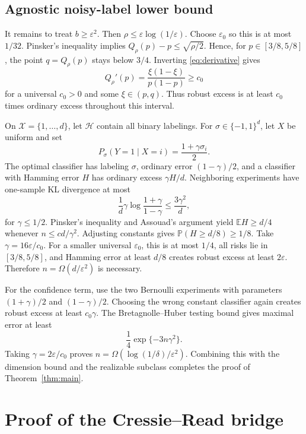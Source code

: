 \documentclass{article}
\theoremstyle{remark}
\newcommand{\E}{\mathbb E}
\newcommand{\Pp}{\mathbb P}
\newcommand{\cH}{\mathcal H}
\newcommand{\eps}{\varepsilon}
\begin{document}
\subsection{Agnostic noisy-label lower bound}

It remains to treat $b\ge\eps^2$.  Then
$\rho\le\eps\log(1/\eps)$.  Choose $\eps_0$ so this is at most $1/32$.
Pinsker's inequality implies
$Q_\rho(p)-p\le\sqrt{\rho/2}$.  Hence, for $p\in[3/8,5/8]$, the point
$q=Q_\rho(p)$ stays below $3/4$.  Inverting
\eqref{eq:derivative} gives
\[
 Q_\rho'(p)=\frac{\xi(1-\xi)}{p(1-p)}\ge c_0
 \label{eq:Q-sensitivity}
\]
for a universal $c_0>0$ and some $\xi\in(p,q)$.  Thus robust excess is at
least $c_0$ times ordinary excess throughout this interval.

On $\mathcal X=\{1,\ldots,d\}$, let $\cH$ contain all binary labelings.  For
$\sigma\in\{-1,1\}^d$, let $X$ be uniform and set
\[
 P_\sigma(Y=1\mid X=i)=\frac{1+\gamma\sigma_i}{2}.
\]
The optimal classifier has labeling $\sigma$, ordinary error
$(1-\gamma)/2$, and a classifier with Hamming error $H$ has ordinary excess
$\gamma H/d$.  Neighboring experiments have one-sample KL divergence at most
\[
 \frac1d\gamma\log\frac{1+\gamma}{1-\gamma}
 \le\frac{3\gamma^2}{d},
\]
for $\gamma\le1/2$.  Pinsker's inequality and Assouad's argument yield
$\E H\ge d/4$ whenever $n\le c d/\gamma^2$.  Adjusting constants gives
$\Pp(H\ge d/8)\ge1/8$.  Take
$\gamma=16\eps/c_0$.  For a smaller universal $\eps_0$, this is at most
$1/4$, all risks lie in $[3/8,5/8]$, and Hamming error at least $d/8$ creates
robust excess at least $2\eps$.  Therefore
$n=\Omega(d/\eps^2)$ is necessary.

For the confidence term, use the two Bernoulli experiments with parameters
$(1+\gamma)/2$ and $(1-\gamma)/2$.  Choosing the wrong constant classifier
again creates robust excess at least $c_0\gamma$.  The
Bretagnolle--Huber testing bound gives maximal error at least
\[
 \frac14\exp\{-3n\gamma^2\}.
\]
Taking $\gamma=2\eps/c_0$ proves
$n=\Omega(\log(1/\delta)/\eps^2)$.  Combining this with the dimension bound
and the realizable subclass completes the proof of
Theorem~\ref{thm:main}.

\section{Proof of the Cressie--Read bridge}
\label{app:bridge}
\end{document}
